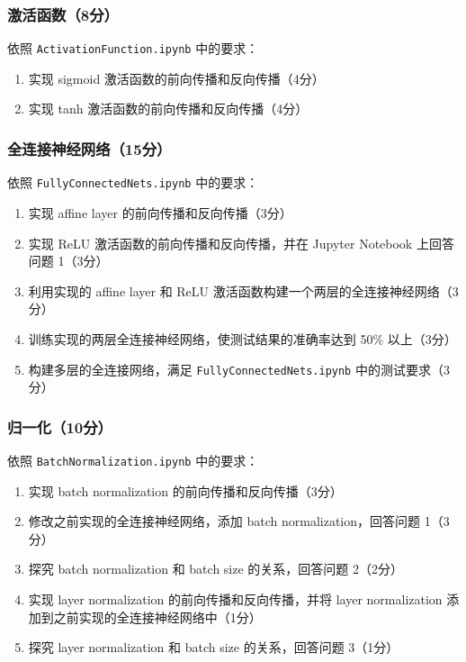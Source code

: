 \documentclass[a4paper]{article}
\begin{document}
\subsubsection{激活函数（8分）}

依照 \texttt{ActivationFunction.ipynb} 中的要求：
\begin{enumerate}
    \item 实现 sigmoid 激活函数的前向传播和反向传播（4分）
    \item 实现 tanh 激活函数的前向传播和反向传播（4分）
\end{enumerate}

\subsubsection{全连接神经网络（15分）}

依照 \texttt{FullyConnectedNets.ipynb} 中的要求：
\begin{enumerate}
    \item 实现 affine layer 的前向传播和反向传播（3分）
    \item 实现 ReLU 激活函数的前向传播和反向传播，并在 Jupyter Notebook 上回答问题 1（3分）
    \item 利用实现的 affine layer 和 ReLU 激活函数构建一个两层的全连接神经网络（3分）
    \item 训练实现的两层全连接神经网络，使测试结果的准确率达到 50\% 以上（3分）
    \item 构建多层的全连接网络，满足 \texttt{FullyConnectedNets.ipynb} 中的测试要求（3分）
\end{enumerate}

\subsubsection{归一化（10分）}

依照 \texttt{BatchNormalization.ipynb} 中的要求：
\begin{enumerate}
    \item 实现 batch normalization 的前向传播和反向传播（3分）
    \item 修改之前实现的全连接神经网络，添加 batch normalization，回答问题 1（3分）
    \item 探究 batch normalization 和 batch size 的关系，回答问题 2（2分）
    \item 实现 layer normalization 的前向传播和反向传播，并将 layer normalization 添加到之前实现的全连接神经网络中（1分）
    \item 探究 layer normalization 和 batch size 的关系，回答问题 3（1分）
\end{enumerate}
\end{document}
